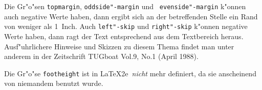 Die Gr"o"sen {\tt \bs topmargin}, {\tt \bs oddside"-margin} und {\tt 
\bs evenside"-margin} k"onnen auch negative Werte haben, dann ergibt 
sich an der betreffenden Stelle ein Rand von weniger als 1~Inch.
Auch {\tt\bs left"-skip} und {\tt\bs right"-skip} k"onnen negative 
Werte haben, dann ragt der Text entsprechend aus dem Textbereich 
heraus. Ausf"uhrlichere Hinweise und Skizzen zu diesem Thema findet 
man unter anderem in der Zeitschrift {\sc TUGboat} Vol.9, No.1 (April 
1988).

Die Gr"o"se {\tt \bs footheight} ist in \LaTeX2e\ \emph{nicht} 
mehr definiert, da sie anscheinend von niemandem benutzt wurde.



\begin{fullpage}


\newcommand{\X}[1]{{#1}\index{{#1}}}
\newcount\T      %


\newcommand{\NAMEBOX}[8]{\put(#1,#2){\begin{picture}(0,0)(-#3,-#4)\ignorespaces
    \framebox(#5,#6)[#7]{#8}\end{picture}}}

\newcommand{\HARROW}[8]{\put(#1,#2){\begin{picture}(0,0)(-#3,-#4)\ignorespaces
    \put(0,0){\vector(1,0){#5}}\ignorespaces
    \put(#5,0){\vector(-1,0){#5}}\ignorespaces
    \ifthenelse{\equal{#6}{b}}{\ignorespaces
      \put(0,-\TAD){\makebox(#5,0)[#7]{#8}}
    }{\ignorespaces
    \ifthenelse{\equal{#6}{t}}{}{\ignorespaces
      \typeout{Side #6 must be ``b'' or ``t''--``t'' assumed}}\ignorespaces
      \put(0,\TAD){\makebox(#5,0)[#7]{#8}}
    }
    \end{picture}}}


\end{fullpage}
